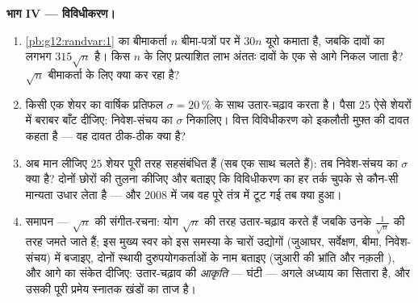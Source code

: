 \begin{problem}
\medskip
\noindent\textbf{भाग IV --- विविधीकरण।}
\begin{enumerate}[resume]
  \item \cref{pb:g12:randvar:1} का बीमाकर्ता $n$ बीमा-पत्रों पर  में $30n$ यूरो
        कमाता है, जबकि दावों का  लगभग $315\sqrt n$ है। किस $n$ के लिए
        प्रत्याशित लाभ अंततः दावों के एक  से आगे निकल जाता है?
        $\sqrt n$ बीमाकर्ता के लिए क्या कर रहा है?
  \item किसी एक शेयर का वार्षिक प्रतिफल $\sigma = 20\,\%$ के साथ उतार-चढ़ाव करता है।
        पैसा $25$ ऐसे \emph{} शेयरों में बराबर बाँट दीजिए:
        निवेश-संचय का $\sigma$ निकालिए। वित्त विविधीकरण को इकलौती मुफ़्त की
        दावत कहता है --- वह दावत ठीक-ठीक क्या है?
  \item अब मान लीजिए $25$ शेयर पूरी तरह सहसंबंधित हैं (सब एक साथ चलते
        हैं): तब निवेश-संचय का $\sigma$ क्या है? दोनों छोरों की तुलना कीजिए
        और बताइए कि विविधीकरण का हर तर्क चुपके से कौन-सी मान्यता उधार लेता
        है --- और 2008 में जब वह पूरे तंत्र में टूट गई तब क्या हुआ।
  \item समापन --- $\sqrt n$ की संगीत-रचना: योग $\sqrt n$ की तरह उतार-चढ़ाव करते हैं
        जबकि उनके  $\frac{1}{\sqrt n}$ की तरह जमते जाते हैं; इस मुख्य स्वर को इस
        समस्या के चारों उद्योगों (जुआघर, सर्वेक्षण, बीमा, निवेश-संचय) में
        बजाइए, दोनों स्थायी दुरुपयोगकर्ताओं के नाम बताइए (जुआरी की भ्रांति
        और नक़ली ), और आगे का संकेत दीजिए: उतार-चढ़ाव की
        \emph{आकृति} --- घंटी --- अगले अध्याय का  सितारा है, और उसकी
        पूरी प्रमेय स्नातक खंडों का ताज है।
\end{enumerate}
\end{problem}
